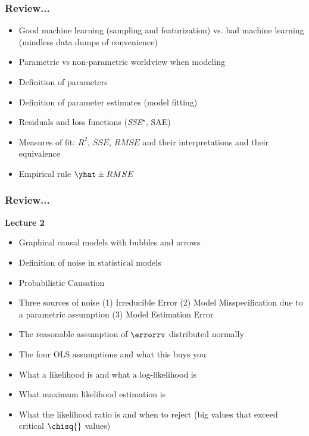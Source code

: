 \documentclass[handout]{beamer}
\begin{document}
\begin{frame}\frametitle{Review...}

\begin{itemize}
\item Good machine learning (sampling and featurization) vs. bad machine learning (mindless data dumps of convenience)
\item Parametric vs non-parametric worldview when modeling
\item Definition of parameters
\item Definition of parameter estimates (model fitting)
\item Residuals and loss functions (\emph{SSE}$^\star$, SAE)
\item Measures of fit: $R^2$, $SSE$, $RMSE$ and their interpretations and their equivalence
\item Empirical rule $\yhat \pm RMSE$
\end{itemize}
	
\end{frame}

\begin{frame}\frametitle{Review...}

\textbf{Lecture 2}

\begin{itemize}
\item Graphical causal models with bubbles and arrows
\item Definition of noise in statistical models
\item Probabilistic Causation
\item Three sources of noise (1) Irreducible Error (2) Model Misspecification due to a parametric assumption (3) Model Estimation Error
\item The reasonable assumption of $\errorrv$ distributed normally
\item The four OLS assumptions and what this buys you
\item What a likelihood is and what a log-likelihood is
\item What maximum likelihood estimation is
\item What the likelihood ratio is and when to reject (big values that exceed critical $\chisq{}$ values)
\end{itemize}
	
\end{frame}
\end{document}
